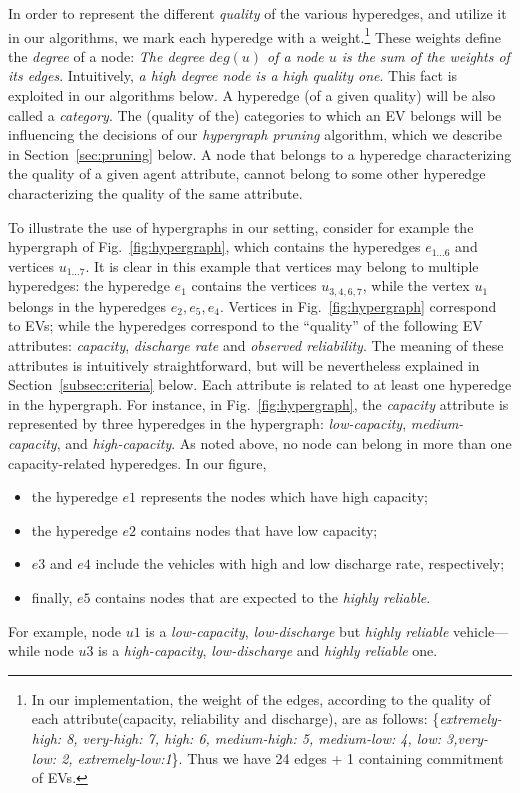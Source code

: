 In order to represent the different {\em quality} of the various hyperedges, and utilize it in our algorithms, we mark each hyperedge with a weight.\footnote{In our implementation, the weight of the edges, according to the quality of each attribute(capacity, reliability and discharge), are as follows: \{\textit{extremely-high: 8, very-high: 7, high: 6, medium-high: 5, medium-low: 4, low: 3,very-low: 2, extremely-low:1}\}. Thus we have 24 edges + 1 containing commitment of EVs.} These weights define the \textit{degree} of a node: {\em The degree $deg(u)$ 
	of a node 
	$u$ 
	is the sum of the weights of its edges}. Intuitively, {\em a high degree node is a high quality one}. This fact is exploited in our algorithms below.
A hyperedge (of a given quality) will be also called a {\em category}. The (quality of the) categories to which an EV belongs will be influencing the decisions of our {\em hypergraph pruning} algorithm, which we describe in Section~\ref{sec:pruning} below. A node that belongs to a hyperedge characterizing the quality of a given agent attribute, cannot belong to some other hyperedge characterizing the quality of the same attribute.


To illustrate the use of hypergraphs in our setting, consider for example the hypergraph of Fig.~\ref{fig:hypergraph}, which contains the hyperedges $e_{1...6}$ and vertices $u_{1...7}$. It is clear in this example that vertices may belong to multiple hyperedges: the hyperedge $e_1$ contains the vertices $u_{3,4,6,7}$, while the vertex $u_1$ belongs in the hyperedges $e_2, e_5, e_4$. Vertices in Fig.~\ref{fig:hypergraph} correspond to EVs; while the hyperedges correspond to the ``quality'' of the following EV attributes: \textit{capacity}, {\em discharge rate} and \textit{observed reliability}. The meaning of these attributes is intuitively straightforward, but will be nevertheless explained in Section~\ref{subsec:criteria} below. Each attribute is related to at least one hyperedge in the hypergraph. For instance, in Fig.~\ref{fig:hypergraph}, the {\em capacity} attribute is represented by three hyperedges in the hypergraph: {\em low-capacity}, {\em medium-capacity}, and {\em high-capacity}. As noted above, no node can belong in more than one capacity-related hyperedges. In our figure, 
\begin{itemize}
	\item the hyperedge $e1$ represents the nodes which have high capacity;
	\item the hyperedge $e2$ contains nodes that have low capacity;
	\item $e3$ and $e4$ include the vehicles with high and low discharge rate, respectively;
	\item finally, $e5$ contains nodes that are expected to the {\em highly reliable}.
\end{itemize}
For example, node $u1$ is a {\em low-capacity}, {\em low-discharge} but {\em highly reliable} vehicle---while node $u3$ is a {\em high-capacity}, {\em low-discharge} and {\em highly reliable} one.

